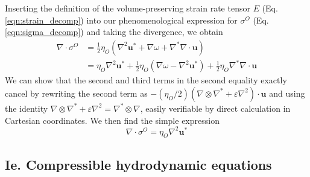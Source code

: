 \documentclass[%
 reprint,
superscriptaddress,
longbibliography,
 amsmath,amssymb,
 prl,
 citeautoscript,
]{revtex4-1}
\begin{document}

Inserting the definition of the volume-preserving strain rate tensor $E$ (Eq. \ref{eqn:strain_decomp}) into our phenomenological expression for $\sigma^O$ (Eq. \ref{eqn:sigma_decomp}) and taking the divergence, we obtain
\begin{equation}
\begin{split}
\nabla \cdot \sigma^O &= \frac{1}{2} \eta_O \left( \nabla^2 {\boldsymbol u}^* + \nabla \omega + \nabla^* \nabla \cdot {\boldsymbol u} \right) \\
&= \eta_O \nabla^2 {\boldsymbol u}^* + \frac{1}{2} \eta_O \left( \nabla \omega - \nabla^2 {\boldsymbol u}^* \right) + \frac{1}{2} \eta_O \nabla^* \nabla \cdot {\boldsymbol u}
\label{eqn:DsigmaO_1}
\end{split}
\end{equation}
We can show that the second and third terms in the second equality exactly cancel by rewriting the second term as $- (\eta_O/2) \left( \nabla \otimes \nabla^* + \varepsilon \nabla^2 \right) \cdot {\boldsymbol u}$ and using the identity $\nabla \otimes \nabla^* + \varepsilon \nabla^2 = \nabla^* \otimes \nabla$, easily verifiable by direct calculation in Cartesian coordinates. We then find the simple expression
\begin{equation}
\nabla \cdot \sigma^O = \eta_O \nabla^2 {\boldsymbol u}^*
\label{eqn:DsigmaO_final}
\end{equation}

\subsection{Ie. Compressible hydrodynamic equations}
\end{document}
